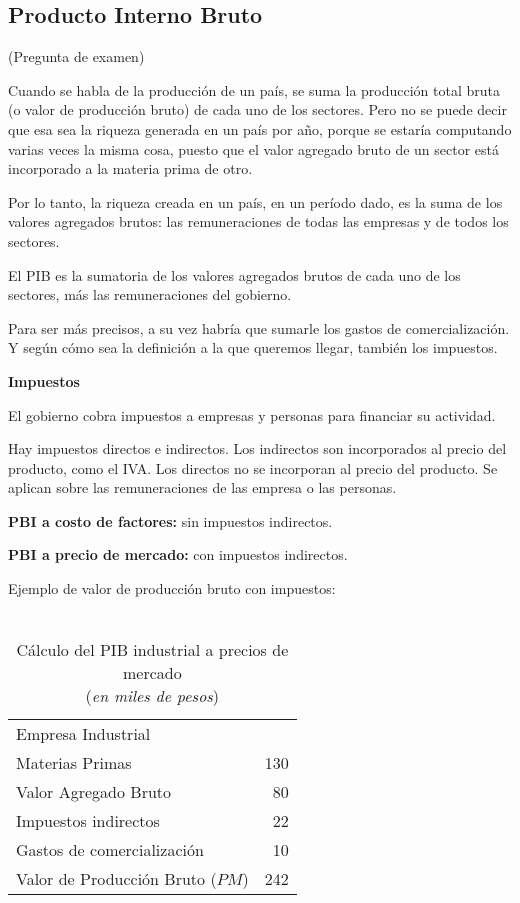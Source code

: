 \subsection{Producto Interno Bruto}

(Pregunta de examen)

Cuando se habla de la producción de un país,
se suma la producción total bruta (o valor de producción bruto)
de cada uno de los sectores.
Pero no se puede decir que esa sea la riqueza generada en un país por año,
porque se estaría computando varias veces la misma cosa,
puesto que el valor agregado bruto de un sector 
está incorporado a la materia prima de otro.

Por lo tanto,
la riqueza creada en un país,
en un período dado,
es la suma de los
valores agregados brutos:
las remuneraciones de todas las empresas y de todos los sectores.

El PIB es la sumatoria de los valores agregados brutos 
de cada uno de los sectores,
más las remuneraciones del gobierno.

Para ser más precisos,
a su vez habría que sumarle los gastos de comercialización.
Y según cómo sea la definición a la que queremos llegar,
también los impuestos.

\textbf{Impuestos}

El gobierno cobra impuestos a empresas y personas para financiar su actividad.

Hay impuestos directos e indirectos.
Los indirectos son incorporados al precio del producto, como el IVA.
Los directos no se incorporan al precio del producto.
Se aplican sobre las remuneraciones de las empresa o las personas.

\textbf{PBI a costo de factores:} sin impuestos indirectos.

\textbf{PBI a precio de mercado:} con impuestos indirectos.

Ejemplo de valor de producción bruto con impuestos:

\vspace{.5cm}
\begin{table}[H]
    \centering
    \caption{\\Cálculo del PIB industrial a precios de mercado\\
        (\textit{en miles de pesos})}
    \vspace{.5cm}
    \begin{tabular}{lr}
        \hline
        Empresa Industrial                 &     \\
        Materias Primas                    & 130 \\
        Valor Agregado Bruto               & 80  \\
        Impuestos indirectos               & 22  \\
        Gastos de comercialización         & 10  \\
        \hline
        Valor de Producción Bruto (\(PM\)) & 242 \\
    \end{tabular}
\end{table}
\vspace{.5cm}

